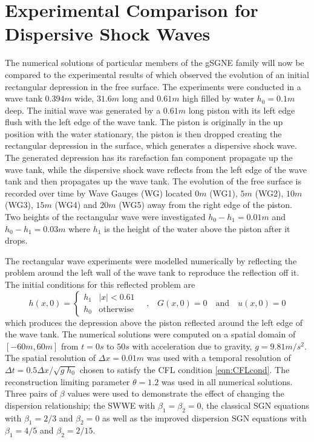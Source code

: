\documentclass[10pt]{elsarticle}
\newcommand{\hl}[1]{{\color[rgb]{1,0,0}#1}}
\begin{document}
\hl{
\section{Experimental Comparison for Dispersive Shock Waves}

The numerical solutions of particular members of the gSGNE family will now be compared to the experimental results of \citet{Hammack-Segur-1978-337} which observed the evolution of an initial rectangular depression in the free surface. The experiments were conducted in a wave tank $0.394m$ wide, $31.6m$ long and $0.61m$ high filled by water $h_0 = 0.1m$ deep. The initial wave was generated by a $0.61m$ long piston with its left edge flush with the left edge of the wave tank. The piston is originally in the up position with the water stationary, the piston is then dropped creating the rectangular depression in the surface, which generates a dispersive shock wave. The generated depression has its rarefaction fan component propagate up the wave tank, while the dispersive shock wave reflects from the left edge of the wave tank and then propagates up the wave tank. The evolution of the free surface is recorded over time by Wave Gauges (WG) located $0m$ (WG1), $5m$ (WG2), $10m$ (WG3), $15m$ (WG4) and $20m$ (WG5) away from the right edge of the piston. Two heights of the rectangular wave were investigated $h_0 - h_1 = 0.01m$ and $h_0 - h_1 = 0.03m$ where $h_1$ is the height of the water above the piston after it drops.

The rectangular wave experiments were modelled numerically by reflecting the problem around the left wall of the wave tank to reproduce the reflection off it. The initial conditions for this reflected problem are
\begin{equation*}
h(x,0) = \begin{cases}
	h_1 &  |x| < 0.61 \\
	h_0 & \text{otherwise}
\end{cases}
\quad
\text{,}
\quad
G(x,0) = 0
\quad
\text{and}
\quad
u(x,0) = 0
\end{equation*}
which produces the depression above the piston reflected around the left edge of the wave tank. The numerical solutions were computed on a spatial domain of $[-60m,60m]$ from $t = 0 s$ to $50s$ with acceleration due to gravity, $g = 9.81m/s^2$. The spatial resolution of $\Delta x = 0.01m$ was used with a temporal resolution of $\Delta t = 0.5 \Delta x / \sqrt{g \; h_0}$ chosen to satisfy the CFL condition \eqref{eqn:CFLcond}. The reconstruction limiting parameter $\theta = 1.2$ was used in all numerical solutions. Three pairs of $\beta$ values were used to demonstrate the effect of changing the dispersion relationship; the SWWE with $\beta_1=\beta_2=0$, the classical SGN equations with $\beta_1=2/3$ and $\beta_2=0$
as well as the improved dispersion SGN equations with  $\beta_1=4/5$ and $\beta_2=2/15$.

}
\end{document}
